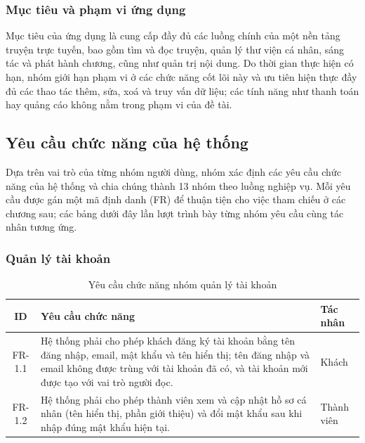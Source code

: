 \subsubsection{Mục tiêu và phạm vi ứng dụng}

Mục tiêu của ứng dụng là cung cấp đầy đủ các luồng chính của một nền tảng truyện trực tuyến, bao gồm tìm và đọc truyện, quản lý thư viện cá nhân, sáng tác và phát hành chương, cũng như quản trị nội dung. Do thời gian thực hiện có hạn, nhóm giới hạn phạm vi ở các chức năng cốt lõi này và ưu tiên hiện thực đầy đủ các thao tác thêm, sửa, xoá và truy vấn dữ liệu; các tính năng như thanh toán hay quảng cáo không nằm trong phạm vi của đề tài.

\subsection{Yêu cầu chức năng của hệ thống}
\label{subsec:functional-requirements}

Dựa trên vai trò của từng nhóm người dùng, nhóm xác định các yêu cầu chức năng của hệ thống và chia chúng thành 13 nhóm theo luồng nghiệp vụ. Mỗi yêu cầu được gán một mã định danh (FR) để thuận tiện cho việc tham chiếu ở các chương sau; các bảng dưới đây lần lượt trình bày từng nhóm yêu cầu cùng tác nhân tương ứng.

\subsubsection{Quản lý tài khoản}

\begin{table}[H]
\centering
\renewcommand{\arraystretch}{1.3}
\begin{tabularx}{\textwidth}{|c|X|p{3cm}|}
\hline
\textbf{ID} & \textbf{Yêu cầu chức năng} & \textbf{Tác nhân} \\ \hline
FR-1.1 & Hệ thống phải cho phép khách đăng ký tài khoản bằng tên đăng nhập, email, mật khẩu và tên hiển thị; tên đăng nhập và email không được trùng với tài khoản đã có, và tài khoản mới được tạo với vai trò người đọc. & Khách \\ \hline
FR-1.2 & Hệ thống phải cho phép thành viên xem và cập nhật hồ sơ cá nhân (tên hiển thị, phần giới thiệu) và đổi mật khẩu sau khi nhập đúng mật khẩu hiện tại. & Thành viên \\ \hline
\end{tabularx}
\caption{Yêu cầu chức năng nhóm quản lý tài khoản}
\label{tab:fr-account}
\end{table}

